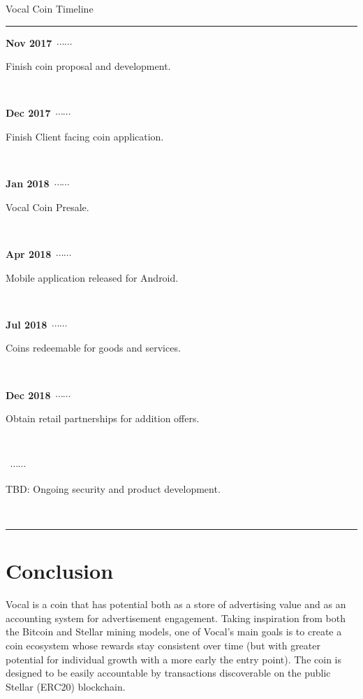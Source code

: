 \documentclass[conference]{IEEEtran}
\begin{document}
    \newcommand\ytl[2]{
    \parbox[b]{8em}{\hfill{\color{cyan}\bfseries\sffamily #1}~$\cdots\cdots$~}\makebox[0pt][c]{$\bullet$}\vrule\quad \parbox[c]{3cm}{\vspace{7pt}\color{red!40!black!80}\raggedright\sffamily #2.\\[7pt]}\\[-3pt]}
    \begin{table}
    \caption{Vocal Coin Timeline}
    \centering
    \begin{minipage}[t]{\linewidth}
    \color{gray}
    \rule{\linewidth}{1pt}
    \ytl{Nov 2017}{Finish coin proposal and development}
    \ytl{Dec 2017}{Finish Client facing coin application}
    \ytl{Jan 2018}{Vocal Coin Presale}
    \ytl{Apr 2018}{Mobile application released for Android}
    \ytl{Jul 2018}{Coins redeemable for goods and services}
    \ytl{Dec 2018}{Obtain retail partnerships for addition offers}
    \ytl{2019}{TBD: Ongoing security and product development}
    \bigskip
    \rule{\linewidth}{1pt}%
    \end{minipage}%
    \end{table}

      
      
    
    \section{Conclusion}
   Vocal is a coin that has potential both as a store of advertising value and as an accounting system for advertisement engagement. Taking inspiration from both the Bitcoin and Stellar mining models, one of Vocal's main goals is to create a coin ecosystem whose rewards stay consistent over time (but with greater potential for individual growth with a more early the entry point). The coin is designed to be easily accountable by transactions discoverable on the public Stellar (ERC20) blockchain.
\end{document}
